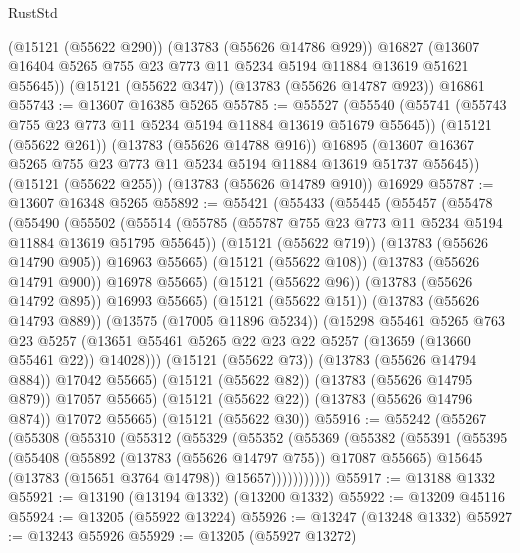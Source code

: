\begin{lexlean}{RustStd}
\begin{coremodule}
      (@15121 (@55622 @290))
      (@13783 (@55626 @14786 @929))
      @16827
      (@13607 @16404 @5265 @755 @23 @773 @11 @5234 @5194 @11884 @13619 @51621 @55645))
    (@15121 (@55622 @347))
    (@13783 (@55626 @14787 @923))
    @16861
@55743 := @13607 @16385 @5265
@55785 := @55527
    (@55540
      (@55741 (@55743 @755 @23 @773 @11 @5234 @5194 @11884 @13619 @51679 @55645))
      (@15121 (@55622 @261))
      (@13783 (@55626 @14788 @916))
      @16895
      (@13607 @16367 @5265 @755 @23 @773 @11 @5234 @5194 @11884 @13619 @51737 @55645))
    (@15121 (@55622 @255))
    (@13783 (@55626 @14789 @910))
    @16929
@55787 := @13607 @16348 @5265
@55892 := @55421
    (@55433
      (@55445
        (@55457
          (@55478
            (@55490
              (@55502
                (@55514
                  (@55785 (@55787 @755 @23 @773 @11 @5234 @5194 @11884 @13619 @51795 @55645))
                  (@15121 (@55622 @719))
                  (@13783 (@55626 @14790 @905))
                  @16963
                  @55665)
                (@15121 (@55622 @108))
                (@13783 (@55626 @14791 @900))
                @16978
                @55665)
              (@15121 (@55622 @96))
              (@13783 (@55626 @14792 @895))
              @16993
              @55665)
            (@15121 (@55622 @151))
            (@13783 (@55626 @14793 @889))
            (@13575 (@17005 @11896 @5234))
            (@15298
              @55461
              @5265
              @763
              @23
              @5257
              (@13651 @55461 @5265 @22 @23 @22 @5257 (@13659 (@13660 @55461 @22)) @14028)))
          (@15121 (@55622 @73))
          (@13783 (@55626 @14794 @884))
          @17042
          @55665)
        (@15121 (@55622 @82))
        (@13783 (@55626 @14795 @879))
        @17057
        @55665)
      (@15121 (@55622 @22))
      (@13783 (@55626 @14796 @874))
      @17072
      @55665)
    (@15121 (@55622 @30))
@55916 := @55242
    (@55267
      (@55308
        (@55310
          (@55312
            (@55329
              (@55352
                (@55369
                  (@55382
                    (@55391
                      (@55395
                        (@55408
                          (@55892 (@13783 (@55626 @14797 @755)) @17087 @55665)
                          @15645
                          (@13783 (@15651 @3764 @14798))
                          @15657)))))))))))
@55917 := @13188 @1332
@55921 := @13190 (@13194 @1332) (@13200 @1332)
@55922 := @13209 @45116
@55924 := @13205 (@55922 @13224)
@55926 := @13247 (@13248 @1332)
@55927 := @13243 @55926
@55929 := @13205 (@55927 @13272)

\end{coremodule}
\end{lexlean}
